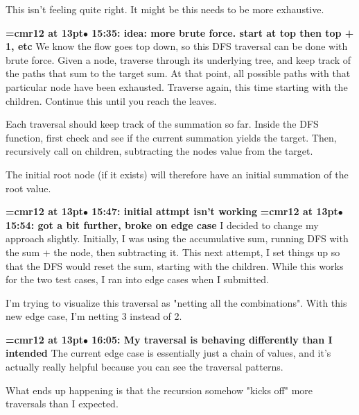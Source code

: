 This isn't feeling quite right. It might be this needs to be more exhaustive.
\par

{\smallskip\noindent\bf\font\titlefont=cmr12 at 13pt\titlefont $\bullet$ 15:35: idea: more brute force. start at top then top + 1, etc}\smallskip
We know the flow goes top down, so this DFS traversal can be done with brute force. Given a node, traverse through its underlying tree, and keep track of the paths that sum to the target sum. At that point, all possible paths with that particular node have been exhausted. Traverse again, this time starting with the children. Continue this until you reach the leaves.
\par

Each traversal should keep track of the summation so far. Inside the DFS function, first check and see if the current summation yields the target. Then, recursively call on children, subtracting the nodes value from the target.
\par

The initial root node (if it exists) will therefore have an initial summation of the root value.
\par

{\smallskip\noindent\bf\font\titlefont=cmr12 at 13pt\titlefont $\bullet$ 15:47: initial attmpt isn't working}\smallskip
{\smallskip\noindent\bf\font\titlefont=cmr12 at 13pt\titlefont $\bullet$ 15:54: got a bit further, broke on edge case}\smallskip
I decided to change my approach slightly. Initially, I was using the accumulative sum, running DFS with the sum + the node, then subtracting it. This next attempt, I set things up so that the DFS would reset the sum, starting with the children. While this works for the two test cases, I ran into edge cases when I submitted.
\par

I'm trying to visualize this traversal as "netting all the combinations". With this new edge case, I'm netting 3 instead of 2.
\par

{\smallskip\noindent\bf\font\titlefont=cmr12 at 13pt\titlefont $\bullet$ 16:05: My traversal is behaving differently than I intended}\smallskip
The current edge case is essentially just a chain of values, and it's actually really helpful because you can see the traversal patterns.
\par

What ends up happening is that the recursion somehow "kicks off" more traversals than I expected.
\par

